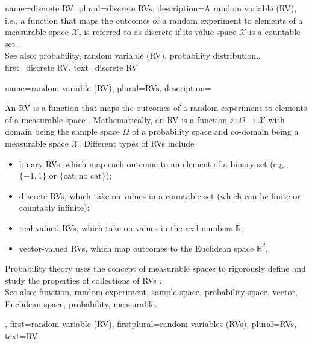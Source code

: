 {
{name={discrete RV}, 
  plural={discrete RVs},
 	description={A random variable (RV), i.e., a function that maps the 
		outcomes of a random experiment to elements of a measurable space $\mathcal{X}$, 
		is referred to as discrete if its value space $\mathcal{X}$ is a countable set \cite{BillingsleyProbMeasure}. 
			\\
		See also: probability, random variable (RV), probability distribution.},
 	first={discrete RV},
 	text={discrete RV}  
}



{name={random variable (RV)}, plural={RVs},
 	description={An RV is a function that maps the 
		outcomes of a random experiment to elements of a measurable space 
		\cite{BillingsleyProbMeasure,GrayProbBook}. 
 		Mathematically, an RV is a function $x: \Omega \rightarrow \mathcal{X}$ 
		with domain being the sample space $\Omega$ of a probability space and 
		co-domain being a measurable space $\mathcal{X}$. 
 		Different types of RVs include  
 		\begin{itemize} 
 			\item {binary RVs}, which map each outcome to an element of a binary 
			set (e.g., $\{-1,1\}$ or $\{\text{cat}, \text{no cat}\}$); 
			\item {discrete RVs}, which take on values in a countable set (which can 
			be finite or countably infinite); 
 			\item {real-valued RVs}, which take on values in the real numbers $\mathbb{R}$;  
 			\item {vector-valued RVs}, which map outcomes to the Euclidean space $\mathbb{R}^{d}$.  
 		\end{itemize} 
 		Probability theory uses the concept of measurable spaces to rigorously define 
 		and study the properties of collections of RVs \cite{BillingsleyProbMeasure}.
			\\
		See also: function, random experiment, sample space, probability space, vector, Euclidean space, probability, measurable.}, 
	first={random variable (RV)},
	firstplural={random variables (RVs)},
	plural={RVs},
	text={RV}  
}
 
}
